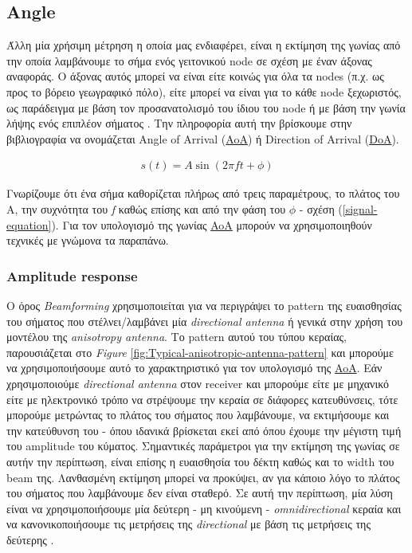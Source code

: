 \subsection{Angle}\label{sec:Chapter2-1-2}
Άλλη μία χρήσιμη μέτρηση η οποία μας ενδιαφέρει, είναι η εκτίμηση της γωνίας από την οποία λαμβάνουμε το σήμα ενός γειτονικού
node σε σχέση με έναν άξονας αναφοράς. Ο άξονας αυτός μπορεί να είναι είτε κοινώς για όλα τα nodes (π.χ. ως προς το βόρειο γεωγραφικό πόλο),
είτε μπορεί να είναι για το κάθε node ξεχωριστός, ως παράδειγμα με βάση τον προσανατολισμό του ίδιου του node ή με βάση την γωνία λήψης ενός 
επιπλέον σήματος \cite{wsn-Localization-systems}. Την πληροφορία αυτή την βρίσκουμε στην βιβλιογραφία να ονομάζεται Angle of Arrival 
(\hyperref[abbr:AoA]{AoA}) ή Direction of Arrival (\hyperref[abbr:DoA]{DoA}). 

\begin{align}
	s(t)=A\sin(2\pi ft + \phi) \label{signal-equation}
\end{align}

Γνωρίζουμε ότι ένα σήμα καθορίζεται πλήρως από τρεις παραμέτρους, το πλάτος του A, την συχνότητα του \emph{f} καθώς 
επίσης και από την φάση του $\phi$ - σχέση (\ref{signal-equation}). Για τον υπολογισμό της γωνίας \hyperref[abbr:AoA]{AoA} μπορούν 
να χρησιμοποιηθούν τεχνικές με γνώμονα τα παραπάνω. 

\subsubsection{Amplitude response}
Ο όρος \emph{Beamforming} \cite{wikipedia-beamforming} χρησιμοποιείται για να περιγράψει το pattern 
της ευαισθησίας του σήματος που στέλνει/λαμβάνει μία \emph{directional antenna} \cite{wikipedia-directionl-antenna} ή γενικά στην χρήση του μοντέλου 
της \emph{anisotropy antenna}. Το pattern αυτού του τύπου κε\-ραί\-ας, παρουσιάζεται στο \emph{Figure} \ref{fig:Typical-anisotropic-antenna-pattern}
\cite{wsn-Localization-techniques} και μπορούμε να χρησιμοποιήσουμε αυτό το χαρακτηριστικό για τον υπολογισμό της \hyperref[abbr:AoA]{AoA}. 
Εάν χρησιμοποιούμε \emph{directional ante\-nna} στον receiver και μπορούμε είτε με μηχανικό είτε με ηλεκτρονικό τρόπο να στρέψουμε
την κεραία σε διάφορες κατευθύνσεις, τότε μπορούμε μετρώντας το πλάτος του σήματος που λαμβάνουμε, να εκτιμήσουμε και την κατεύθυνση του - όπου ιδανικά
βρίσκεται εκεί από όπου έχουμε την μέγιστη τιμή του amplitude του κύματος. Σημαντικές παράμετροι για την εκτίμηση της γωνίας σε αυτήν την περίπτωση, 
είναι επίσης η ευαισθησία του δέκτη καθώς και το width του beam της. 
Λανθασμένη εκτίμηση μπορεί να προκύψει, αν για κάποιο λόγο το πλάτος του σήματος που λαμβάνουμε δεν είναι σταθερό. Σε αυτή την περίπτωση, μία λύση
είναι να χρησιμοποιήσουμε μία δεύτερη - μη κινούμενη - \emph{omnidirectional} κεραία και να κανονικοποιήσουμε τις μετρήσεις της \emph{directional} με βάση τις   
μετρήσεις της δεύτερης \cite{wsn-Localization-techniques}.


